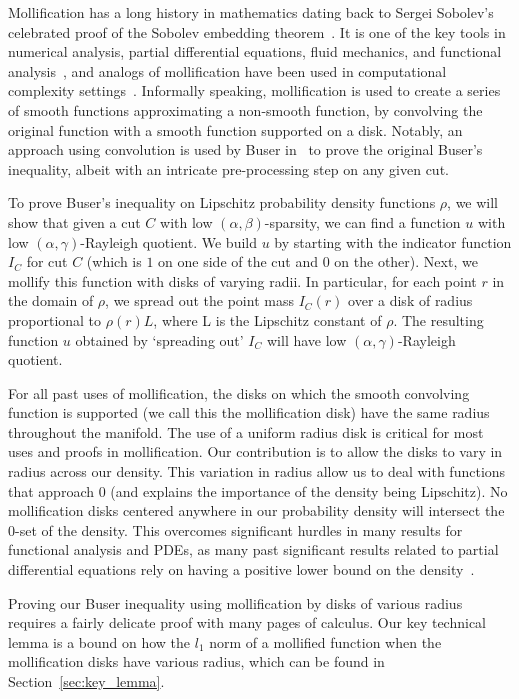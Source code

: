 Mollification has a long history in mathematics dating back to Sergei
Sobolev's celebrated proof of the Sobolev embedding
theorem~\cite{s38}. It is one of the key tools in numerical
analysis, partial differential equations, fluid mechanics, and functional
analysis~\cite{f44, lw01, ss09, m03}, and analogs of mollification have been
used in computational complexity settings~\cite{dkn09}.  Informally
speaking, mollification is used to
create a series of smooth functions approximating a non-smooth
function,  by  convolving the original function with a
smooth function supported on a disk.  
Notably, an approach using convolution is used by Buser in~\cite{Buser82} to
prove the original Buser's inequality, albeit with an intricate
pre-processing step on any given cut.

To prove Buser's inequality on Lipschitz probability density functions $\rho$, we
will show that given a cut $C$ with low $(\alpha, \beta)$-sparsity, we can find a function $u$ with low $(\alpha, \gamma)$-Rayleigh
quotient. We build $u$ by starting with the indicator function $I_C$ for
cut $C$ (which is $1$ on one side of the cut and $0$ on the other).
Next, we mollify this function with disks of varying radii. In
particular, for each point $r$ in the domain of $\rho$, we
spread out the point mass $I_C(r)$ over a disk of radius
proportional to $\rho(r)L$, where L is the Lipschitz constant of $\rho$.
The resulting function $u$ obtained by `spreading out' $I_C$ will have
low $(\alpha, \gamma)$-Rayleigh quotient.

For all past uses of mollification, the disks on which the smooth
convolving function is supported (we call this the mollification
    disk) have the same radius throughout
the manifold. The use of a uniform radius disk is critical for most uses and proofs in mollification.  
Our contribution is to allow the disks to vary in
radius across our density.  This variation in radius allow us to
deal with functions that approach $0$ (and explains the importance
    of the density being Lipschitz). No mollification disks
centered anywhere in our probability density will intersect
the $0$-set of the density. This overcomes significant
hurdles in many results for functional analysis and PDEs, as
many past significant results related to partial
differential equations rely on having a positive lower
bound on the density~\cite{w17, TrillosRate15}.

Proving our Buser inequality using
mollification by disks of various radius requires a fairly
delicate proof with many pages of calculus. Our key technical
lemma is a bound on how the $l_1$ norm of a mollified function
when the mollification disks have various radius, which can be
found in Section~\ref{sec:key_lemma}. 
